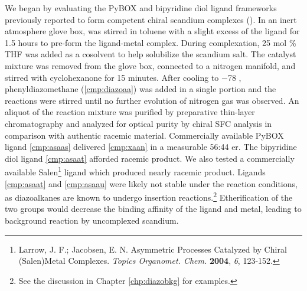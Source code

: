 We began by evaluating the PyBOX and bipyridine
diol ligand frameworks previously reported to form competent
chiral scandium complexes (). In an inert atmosphere glove box,
 was stirred in toluene with a slight excess of the ligand for 1.5 hours to pre-form
the ligand-metal complex. During complexation, 25 mol \% THF was added as a cosolvent to help
solubilize the scandium salt. The catalyst mixture was removed from the glove box, connected to a nitrogen manifold, and stirred with cyclohexanone for 15 minutes. After cooling to $-$78 \degc,
phenyldiazomethane (\ref{cmp:diazoaa}) was added in a single portion and the reactions were stirred
until no further evolution of nitrogen gas was observed. An aliquot of the reaction mixture was purified by
preparative thin-layer chromatography and analyzed for optical purity by chiral SFC analysis in
comparison with authentic racemic material. Commercially available PyBOX ligand \ref{cmp:asaas}
delivered \ref{cmp:xaan} in a measurable 56:44 er. The bipyridine diol ligand \ref{cmp:asaat} afforded racemic product. We also tested a
commercially available Salen\footnote{{\frenchspacing Larrow, J. F.; Jacobsen, E. N. Asymmetric
Processes Catalyzed by Chiral (Salen)Metal Complexes. \textit{Topics Organomet. Chem.} \textbf{2004}, \textit{6},
123-152.}} ligand which produced nearly racemic product. Ligands \ref{cmp:asaat} and \ref{cmp:asaau}
were likely not stable under the reaction conditions, as diazoalkanes are known to undergo 
insertion reactions.\footnote{See the discussion in Chapter \ref{chp:diazobkg} for examples.}
Etherification of the two  groups would decrease the binding affinity of the ligand and
metal, leading to background reaction by uncomplexed scandium.
